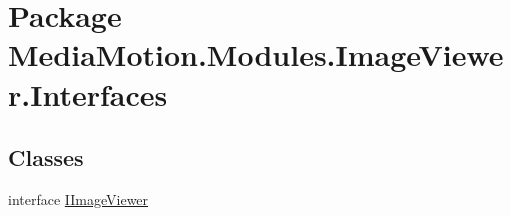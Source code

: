 \hypertarget{namespace_media_motion_1_1_modules_1_1_image_viewer_1_1_interfaces}{\section{Package Media\+Motion.\+Modules.\+Image\+Viewer.\+Interfaces}
\label{namespace_media_motion_1_1_modules_1_1_image_viewer_1_1_interfaces}
}
\subsection*{Classes}
\begin{DoxyCompactItemize}
\item 
interface \hyperlink{interface_media_motion_1_1_modules_1_1_image_viewer_1_1_interfaces_1_1_i_image_viewer}{I\+Image\+Viewer}
\end{DoxyCompactItemize}
